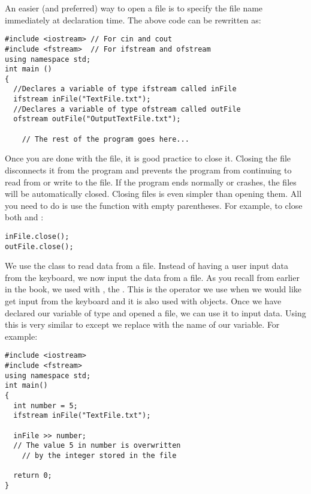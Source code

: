 An easier (and preferred) way to open a file is to specify the file name immediately at declaration time.
The above code can be rewritten as:

\noindent\begin{minipage}{\linewidth}\begin{lstlisting}
#include <iostream> // For cin and cout 
#include <fstream>  // For ifstream and ofstream
using namespace std;
int main ()
{
  //Declares a variable of type ifstream called inFile
  ifstream inFile("TextFile.txt"); 
  //Declares a variable of type ofstream called outFile
  ofstream outFile("OutputTextFile.txt"); 
	
	// The rest of the program goes here...
\end{lstlisting}\end{minipage}




Once you are done with the file, it is good practice to close it. 
Closing the file disconnects it from the program and prevents the program from continuing to read from or write to the file. 
If the program ends normally or crashes, the files will be automatically closed. 
Closing files is even simpler than opening them. 
All you need to do is use the  function with empty parentheses. 
For example, to close both  and :

\noindent\begin{minipage}{\linewidth}\begin{lstlisting}		
inFile.close();
outFile.close();
\end{lstlisting}\end{minipage}
	

We use the  class to read data from a file. 
Instead of having a user input data from the keyboard, we now input the data from a file. 
As you recall from earlier in the book, we used  with \Code{>>}, the . 
This is the operator we use when we would like get input from the keyboard and it is also used with  objects. 
Once we have declared our variable of type  and opened a file, we can use it to input data. 
Using this is very similar to  except we replace  with the name of our variable.
For example: \nopagebreak[4]

\noindent\begin{minipage}{\linewidth}\begin{lstlisting}		
#include <iostream> 
#include <fstream>
using namespace std;
int main()
{
  int number = 5;
  ifstream inFile("TextFile.txt");

  inFile >> number; 
  // The value 5 in number is overwritten
	// by the integer stored in the file

  return 0;
}
\end{lstlisting}\end{minipage}		


